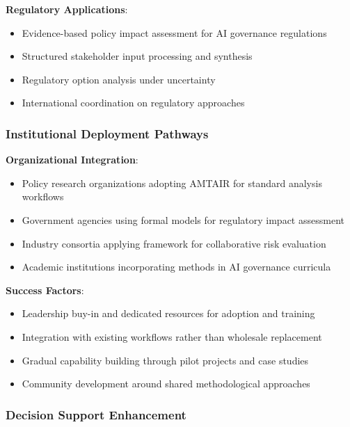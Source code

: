 \documentclass[
  11pt,
  letterpaper,
]{book}
\providecommand{\tightlist}{%
  \setlength{\itemsep}{0pt}\setlength{\parskip}{0pt}}
\begin{document}
\textbf{Regulatory Applications}:

\begin{itemize}
\tightlist
\item
  Evidence-based policy impact assessment for AI governance regulations
\item
  Structured stakeholder input processing and synthesis
\item
  Regulatory option analysis under uncertainty
\item
  International coordination on regulatory approaches
\end{itemize}

\subsubsection{Institutional Deployment
Pathways}\label{sec-deployment-pathways}

\textbf{Organizational Integration}:

\begin{itemize}
\tightlist
\item
  Policy research organizations adopting AMTAIR for standard analysis
  workflows
\item
  Government agencies using formal models for regulatory impact
  assessment
\item
  Industry consortia applying framework for collaborative risk
  evaluation
\item
  Academic institutions incorporating methods in AI governance curricula
\end{itemize}

\textbf{Success Factors}:

\begin{itemize}
\tightlist
\item
  Leadership buy-in and dedicated resources for adoption and training
\item
  Integration with existing workflows rather than wholesale replacement
\item
  Gradual capability building through pilot projects and case studies
\item
  Community development around shared methodological approaches
\end{itemize}

\subsubsection{Decision Support Enhancement}\label{sec-decision-support}
\end{document}
